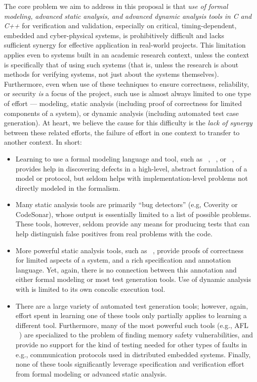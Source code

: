 The core problem we aim to address in this proposal is that \emph{use of formal modeling, advanced static analysis, and advanced dynamic analysis tools in C and C++} for verification and validation, especially on critical, timing-dependent, embedded and cyber-physical systems, is prohibitively difficult and lacks sufficient synergy for effective application in real-world projects.  This limitation applies even to systems built in an academic research context, unless the context is specifically that of using such systems (that is, unless the research is about methods for verifying systems, not just about the systems themselves).  Furthermore, even when use of these techniques to ensure correctness, reliability, or security \emph{is} a focus of the project, such use is almost always limited to one type of effort --- modeling, static analysis (including proof of correctness for limited components of a system), or dynamic analysis (including automated test case generation).  At heart, we believe the cause for this difficulty is the \emph{lack of synergy} between these related efforts, the failure of effort in one context to transfer to another context.  In short:

\begin{itemize}
\item Learning to use a formal modeling language and tool, such as \uppaal~\cite{uppaal}, \prism~\cite{KNP2011:CAV}, or \spin~\cite{SPIN}, provides help in discovering defects in a high-level, abstract formulation of a model or protocol, but seldom helps with implementation-level problems not directly modeled in the formalism.
\item Many static analysis tools are primarily ``bug detectors'' (e.g, Coverity or CodeSonar), whose output is essentially limited to a list of possible problems.  These tools, however, seldom provide any means for producing tests that can help distinguish false positives from real problems with the code.
\item More powerful static analysis tools, such as \framac~\cite{KKP2015:FAC}, provide proofs of correctness for limited aspects of a system, and a rich specification and annotation language.  Yet, again, there is no connection between this annotation and either formal modeling or most test generation tools.  Use of dynamic analysis with \framac is limited to its own concolic execution tool.
\item There are a large variety of automated test generation tools; however, again, effort spent in learning one of these tools only partially applies to learning a different tool.  Furthermore, many of the most powerful such tools (e.g., AFL ~\cite{aflfuzz}) are specialized to the problem of finding memory safety vulnerabilities, and provide no support for  the kind of testing needed for  other types of faults in e.g., communication protocols used in distributed embedded systems.  Finally, none of these tools significantly leverage specification and verification effort from formal modeling or advanced static analysis.
\end{itemize}

